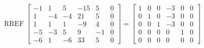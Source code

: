 \begin{exerciseAnswer} 


\[\operatorname{RREF} \left[\begin{array}{ccccc|c}
-1 & 1 & 5 & -15 & 5 & 0 \\
1 & -4 & -4 & 21 & 5 & 0 \\
1 & 1 & 1 & -9 & 4 & 0 \\
-5 & -3 & 5 & 9 & -1 & 0 \\
-6 & 1 & -6 & 33 & 5 & 0
\end{array}\right] = \left[\begin{array}{ccccc|c}
1 & 0 & 0 & -3 & 0 & 0 \\
0 & 1 & 0 & -3 & 0 & 0 \\
0 & 0 & 1 & -3 & 0 & 0 \\
0 & 0 & 0 & 0 & 1 & 0 \\
0 & 0 & 0 & 0 & 0 & 0
\end{array}\right] \]



\end{exerciseAnswer}

